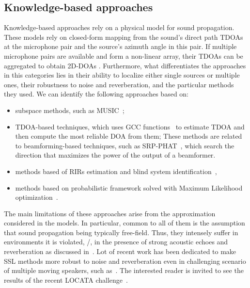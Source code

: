 \subsection{Knowledge-based approaches}
Knowledge-based approaches rely on a physical model for sound propagation. %
These models rely on closed-form mapping from the sound's direct path \acfp{TDOA} at the microphone pair and the source's azimuth angle in this pair.
If multiple microphone pairs are available and form a non-linear array, their \acp{TDOA} can be aggregated to obtain 2D-\ac{DOA}s .
Furthermore, what differentiates the approaches in this categories lies in their ability to localize either single sources or multiple ones, their robustness to noise and reverberation, and the particular methods they used.
We can identify the following approaches based on:
\begin{itemize}
    \item subspace methods, such as \ac{MUSIC}~;
    \item \ac{TDOA}-based techniques, which uses \ac{GCC} functions~ to estimate \ac{TDOA} and then compute the most reliable \ac{DOA} from them;
    These methods are related to beamforming-based techniques, such as \ac{SRP-PHAT}~, which search the direction that maximizes the power of the output of a beamformer.
    \item methods based of \acp{RIR} estimation and blind system identification~,
    \item methods based on probabilistic framework solved with Maximum Likelihood optimization~.
\end{itemize}
The main limitations of these approaches arise from the approximation considered in the models.
In particular, common to all of them is the assumption that sound propagation being typically free-field.
Thus, they intensely suffer in environments it is violated, \eg/, in the presence of strong acoustic echoes and reverberation as discussed in~.
Lot of recent work has been dedicated to make \ac{SSL} methods more robust to noise and reverberation even in challenging scenario of multiple moving speakers, such as~.
The interested reader is invited to see the results of the recent LOCATA challenge~.

